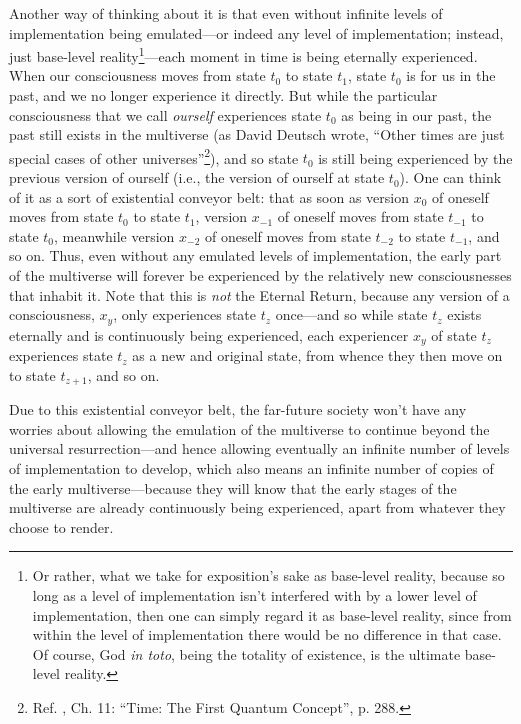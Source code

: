\documentclass[letterpaper,12pt]{article}
\begin{document}
Another way of thinking about it is that even without infinite levels of implementation being emulated---or indeed any level of implementation; instead, just base-level reality\footnote{Or rather, what we take for exposition's sake as base-level reality, because so long as a level of implementation isn't interfered with by a lower level of implementation, then one can simply regard it as base-level reality, since from within the level of implementation there would be no difference in that case. Of course, God \emph{in toto}, being the totality of existence, is the ultimate base-level reality.}---each moment in time is being eternally experienced. When our consciousness moves from state \( t_0 \) to state \( t_1 \), state \( t_0 \) is for us in the past, and we no longer experience it directly. But while the particular consciousness that we call \emph{ourself} experiences state \( t_0 \) as being in our past, the past still exists in the multiverse (as David Deutsch wrote, ``Other times are just special cases of other universes''\footnote{Ref. , Ch. 11: ``Time: The First Quantum Concept'', p. 288.}), and so state \( t_0 \) is still being experienced by the previous version of ourself (i.e., the version of ourself at state \( t_0 \)). One can think of it as a sort of existential conveyor belt: that as soon as version \( x_0 \) of oneself moves from state \( t_0 \) to state \( t_1 \), version \( x_{-1} \) of oneself moves from state \( t_{-1} \) to state \( t_0 \), meanwhile version \( x_{-2} \) of oneself moves from state \( t_{-2} \) to state \( t_{-1} \), and so on. Thus, even without any emulated levels of implementation, the early part of the multiverse will forever be experienced by the relatively new consciousnesses that inhabit it. Note that this is \emph{not} the Eternal Return, because any version of a consciousness, \( x_y \), only experiences state \( t_z \) once---and so while state \( t_z \) exists eternally and is continuously being experienced, each experiencer \( x_y \) of state \( t_z \) experiences state \( t_z \) as a new and original state, from whence they then move on to state \( t_{z+1} \), and so on.

Due to this existential conveyor belt, the far-future society won't have any worries about allowing the emulation of the multiverse to continue beyond the universal resurrection---and hence allowing eventually an infinite number of levels of implementation to develop, which also means an infinite number of copies of the early multiverse---because they will know that the early stages of the multiverse are already continuously being experienced, apart from whatever they choose to render.
\end{document}
